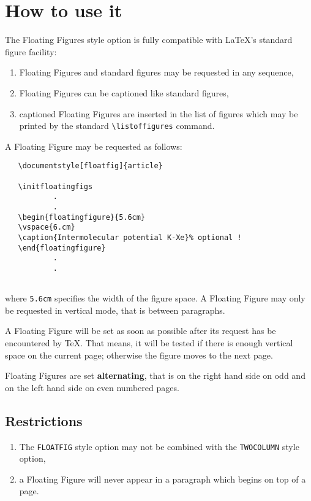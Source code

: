  \section{How to use it}
 The Floating Figures style option is fully compatible with 
 \LaTeX's standard figure facility:
 \begin{enumerate}
 \item Floating Figures and standard figures may be requested
       in any sequence,
 \item Floating Figures can be captioned like standard figures,
 \item captioned Floating Figures are inserted in the list of figures 
       which may be printed by the standard \verb+\listoffigures+ command.
 \end{enumerate}
 A Floating Figure may be requested as follows:
 \begin{verbatim}
   \documentstyle[floatfig]{article}
   
   \initfloatingfigs
           .
           . 
   \begin{floatingfigure}{5.6cm}
   \vspace{6.cm}
   \caption{Intermolecular potential K-Xe}% optional !
   \end{floatingfigure}
           .
           .
   
 \end{verbatim}
 where {\tt 5.6cm} specifies the width of the figure space. 
 A Floating Figure may only be requested in vertical mode, that is
 between paragraphs.
  
 A Floating Figure will be set as soon as possible after its request
 has be encountered by \TeX. 
 That means,
 it will be tested if there is enough vertical space 
 on the current page;
 otherwise the figure moves to the next page. 
  
 Floating Figures are set {\bf alternating}, 
 that is on the right hand side on odd and
 on the left hand side on even numbered pages.
 \subsection{Restrictions}
 \begin{enumerate}
 \item The {\tt FLOATFIG} style option may not be combined with the
 {\tt TWOCOLUMN} style option,
 \item a Floating Figure will never appear in a paragraph which begins on top
 of a page.
 \end{enumerate}
